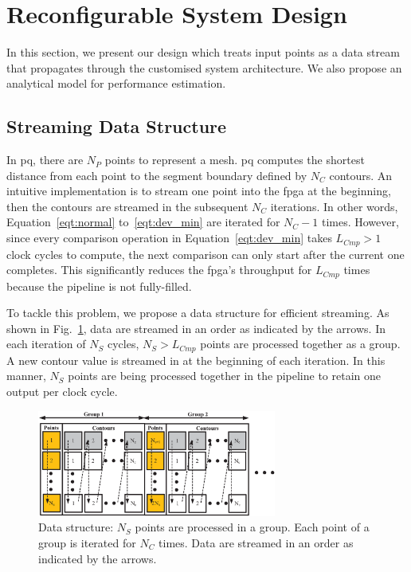 \section{Reconfigurable System Design}
\label{sec:implementation}

In this section, we present our design which treats input points as a data stream that propagates through the customised system architecture.
We also propose an analytical model for performance estimation.

\subsection{Streaming Data Structure}
In \gls{pq}, there are $N_P$ points to represent a mesh.
\gls{pq} computes the shortest distance from each point to the segment boundary defined by $N_C$ contours.
An intuitive implementation is to stream one point into the \gls{fpga} at the beginning,
then the contours are streamed in the subsequent $N_C$ iterations.
In other words, Equation~\ref{eqt:normal} to~\ref{eqt:dev_min} are iterated for $N_C-1$ times.
However, since every comparison operation in Equation~\ref{eqt:dev_min} takes $L_{Cmp}>1$ clock cycles to compute, the next comparison can only start after the current one completes. 
This significantly reduces the \gls{fpga}'s throughput for $L_{Cmp}$ times because the pipeline is not fully-filled.

To tackle this problem, we propose a data structure for efficient streaming.
As shown in Fig.~\ref{fig:stream}, data are streamed in an order as indicated by the arrows.
In each iteration of $N_S$ cycles, $N_{S}>L_{Cmp}$ points are processed together as a group.
A new contour value is streamed in at the beginning of each iteration.
In this manner, $N_{S}$ points are being processed together in the pipeline to retain one output per clock cycle.

\begin{figure}[ht]
\begin{center}
\includegraphics[width=0.7\textwidth]{mixed_precision/figures/stream}
\end{center}
\caption{Data structure: 
$N_S$ points are processed in a group. 
Each point of a group is iterated for $N_C$ times.
Data are streamed in an order as indicated by the arrows.}
\label{fig:stream}
\end{figure}


